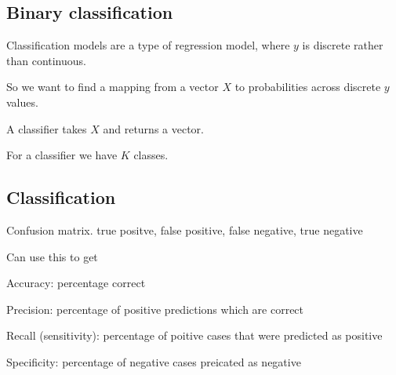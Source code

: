
\subsection{Binary classification}

Classification models are a type of regression model, where \(y\) is discrete rather than continuous.

So we want to find a mapping from a vector \(X\) to probabilities across discrete \(y\) values.

A classifier takes \(X\) and returns a vector.

For a classifier we have \(K\) classes. 


\subsection{Classification}

Confusion matrix. true positve, false positive, false negative, true negative

Can use this to get

Accuracy: percentage correct

Precision: percentage of positive predictions which are correct

Recall (sensitivity): percentage of poitive cases that were predicted as positive

Specificity: percentage of negative cases preicated as negative 

